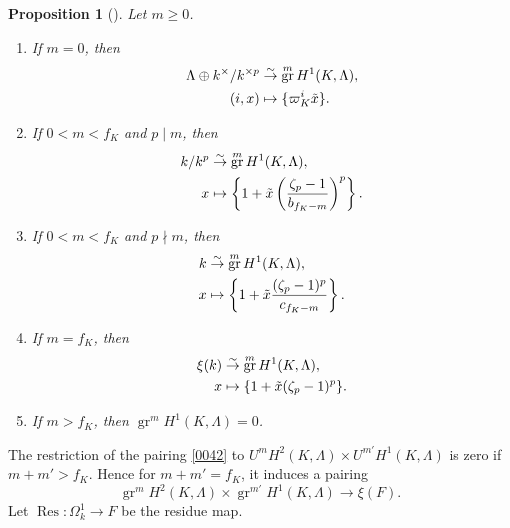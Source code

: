 \documentclass{amsart}
\newtheorem{Prop}[Thm]{Proposition}
\theoremstyle{remark}
\numberwithin{equation}{subsection}
\newcommand{\isomto}{\overset{\sim}{\to}}
\DeclareMathOperator{\Res}{Res}
\DeclareMathOperator{\gr}{gr}
\begin{document}
\begin{Prop}[{\cite[\S 6]{Kat79}}] \label{0044}
	Let $m \ge 0$.
	\begin{enumerate}
		\item \label{0180}
			If $m = 0$, then
				\begin{align*}
							\Lambda \oplus k^{\times} / k^{\times p}
					&	\isomto
							\gr^{m} H^{1}(K, \Lambda),
					\\
							(i, x)
					&	\mapsto
							\{\varpi_{K}^{i} \Tilde{x}\}.
				\end{align*}
		\item \label{0181}
			If $0 < m < f_{K}$ and $p \mid m$, then
				\begin{align*}
							k / k^{p}
					&	\isomto
							\gr^{m} H^{1}(K, \Lambda),
					\\
							x
					&	\mapsto
							\left\{
								1 + \Tilde{x} \left(
									\frac{\zeta_{p} - 1}{b_{f_{K} - m}}
								\right)^{p}
							\right\}.
				\end{align*}
		\item \label{0182}
			If $0 < m < f_{K}$ and $p \nmid m$, then
				\begin{align*}
							k
					&	\isomto
							\gr^{m} H^{1}(K, \Lambda),
					\\
							x
					&	\mapsto
							\left\{
								1 + \Tilde{x} \frac{(\zeta_{p} - 1)^{p}}{c_{f_{K} - m}}
							\right\}.
				\end{align*}
		\item \label{0183}
			If $m = f_{K}$, then
				\begin{align*}
							\xi(k)
					&	\isomto
							\gr^{m} H^{1}(K, \Lambda),
					\\
							x
					&	\mapsto
							\{1 + \Tilde{x} (\zeta_{p} - 1)^{p}\}.
				\end{align*}
		\item \label{0184}
			If $m > f_{K}$, then $\gr^{m} H^{1}(K, \Lambda) = 0$.
	\end{enumerate}
\end{Prop}

The restriction of the pairing \eqref{0042} to
	$
			U^{m} H^{2}(K, \Lambda)
		\times
			U^{m'} H^{1}(K, \Lambda)
	$
is zero if $m + m' > f_{K}$.
Hence for $m + m' = f_{K}$, it induces a pairing
	\begin{equation} \label{0045}
				\gr^{m} H^{2}(K, \Lambda)
			\times
				\gr^{m'} H^{1}(K, \Lambda)
		\to
			\xi(F).
	\end{equation}
Let $\Res \colon \Omega_{k}^{1} \to F$ be the residue map.
\end{document}
